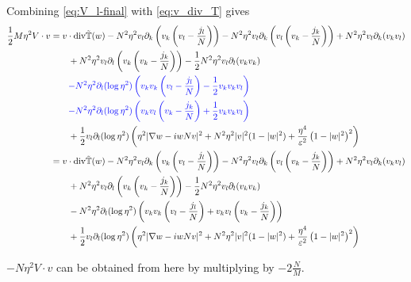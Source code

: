 \documentclass[a4paper]{article}
\renewcommand{\div}{\mathrm{div}}
\begin{document}
Combining \eqref{eq:V_l-final} with \eqref{eq:v_div_T} gives
\begin{align}
  \frac{1}{2} M \eta^2 V \cdot v &= v \cdot \div \tilde{\mathbb{T}}(w) - N^2 \eta^2 v_l \partial_k \left( v_k \left( v_l - \frac{j_l}{N} \right) \right) -
  N^2 \eta^2 v_l \partial_k \left( v_l \left( v_k - \frac{j_k}{N} \right) \right) + N^2 \eta^2 v_l \partial_k (v_k v_l) \nonumber \\
  &\quad \quad + N^2 \eta^2 v_l \partial_l \left( v_k \left( v_k - \frac{j_k}{N} \right) \right) - \frac{1}{2} N^2 \eta^2 v_l \partial_l (v_k v_k)
  \nonumber \\
  &\quad \quad { \color{blue} - N^2 \eta^2 \partial_l (\log \eta^2) \left( v_k v_k \left( v_l - \frac{j_l}{N} \right) - \frac{1}{2} v_k v_k v_l
  \right) } \nonumber \\
  &\quad \quad { \color{blue} - N^2 \eta^2 \partial_l (\log \eta^2) \left( v_k v_l \left( v_k - \frac{j_k}{N} \right) + \frac{1}{2} v_k v_k v_l
  \right) } \nonumber \\
  &\quad \quad + \frac{1}{2} v_l \partial_l (\log \eta^2) \left( \eta^2 |\nabla w - i w N v|^2 + N^2 \eta^2 |v|^2(1-|w|^2) +
  \frac{\eta^4}{\varepsilon^2} \left( 1 - |w|^2 \right)^2 \right) \nonumber \\
  &= v \cdot \div \tilde{\mathbb{T}}(w) - N^2 \eta^2 v_l \partial_k \left( v_k \left( v_l - \frac{j_l}{N} \right) \right) -
  N^2 \eta^2 v_l \partial_k \left( v_l \left( v_k - \frac{j_k}{N} \right) \right) + N^2 \eta^2 v_l \partial_k (v_k v_l) \nonumber \\
  &\quad \quad + N^2 \eta^2 v_l \partial_l \left( v_k \left( v_k - \frac{j_k}{N} \right) \right) - \frac{1}{2} N^2 \eta^2 v_l \partial_l (v_k v_k)
  \nonumber \\
  &\quad \quad - N^2 \eta^2 \partial_l (\log \eta^2) \left( v_k v_k \left( v_l - \frac{j_l}{N} \right) + v_k v_l \left( v_k - \frac{j_k}{N} \right) \right) \nonumber \\
  &\quad \quad + \frac{1}{2} v_l \partial_l (\log \eta^2) \left( \eta^2 |\nabla w - i w N v|^2 + N^2 \eta^2 |v|^2(1-|w|^2) +
  \frac{\eta^4}{\varepsilon^2} \left( 1 - |w|^2 \right)^2 \right)
  \label{eq:M_V_dot_v}
\end{align}

$-N \eta^2 V \cdot v$ can be obtained from here by multiplying by $-2 \frac{N}{M}$.
\end{document}
